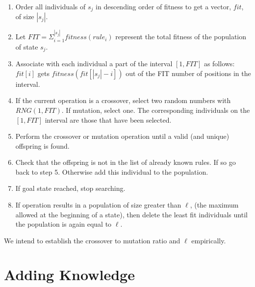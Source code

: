 \documentclass{amsart}
\theoremstyle{definition}
\theoremstyle{remark}
\numberwithin{equation}{section}
\begin{document}
\begin{enumerate}
	\item Order all individuals of $s_j$ in descending order of fitness to get a vector, $fit$, of size $|s_j|$.
	\item Let $FIT = \Sigma_{i=1}^{|s_j|} fitness(rule_i)$ represent the total fitness of the population of state $s_j$.
	\item Associate with each individual a part of the interval $[1,FIT]$ as follows: $fit[i]$ gets $fitness(fit[|s_j| - i])$ out of the FIT number of positions in the interval.
	\item If the current operation is a crossover, select two random numbers with $RNG(1,FIT)$. If mutation, select one. The corresponding individuals on the $[1,FIT]$ interval are those that have been selected.
	\item Perform the crossover or mutation operation until a valid (and unique) offspring is found. 
    \item Check that the offspring is not in the list of already known rules. If so go back to step 5. Otherwise add this individual to the population. 
	\item If goal state reached, stop searching.
	\item If operation results in a population of size greater than $\ell$, (the maximum allowed at the beginning of a state), then delete the least fit individuals until the population is again equal to $\ell$.
\end{enumerate}

We intend to establish the crossover to mutation ratio and $\ell$ empirically. 

\section{Adding Knowledge}
\end{document}
